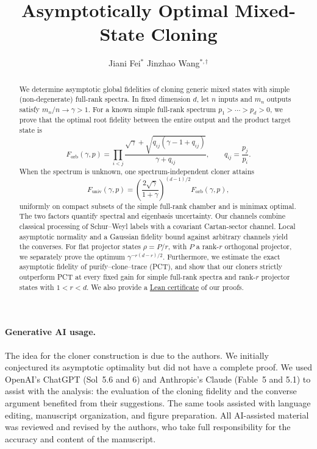 \documentclass[11pt]{article}
\title{Asymptotically Optimal Mixed-State Cloning}
\author{Jiani Fei\(^{*}\)\qquad
  Jinzhao Wang\(^{*,\dagger}\)}
\date{}
\theoremstyle{remark}
\theoremstyle{plain}
\newcommand{\Forb}{F_{\mathrm{orb}}}
\newcommand{\Funiv}{F_{\mathrm{univ}}}
\begin{document}
\maketitle
\begingroup
\renewcommand{\thefootnote}{\fnsymbol{footnote}}
\endgroup

\begin{abstract}
We determine asymptotic global fidelities of cloning generic
mixed states with simple (non-degenerate) full-rank spectra. In fixed dimension $d$, let $n$ inputs and
$m_n$ outputs satisfy $m_n/n\to\gamma>1$.  For a known simple
full-rank spectrum $p_1>\cdots>p_d>0$, we prove that the optimal root
fidelity between the entire output and the product target state is
$$
  \Forb(\gamma,p)
  =\prod_{i<j}
  \frac{\sqrt{\gamma}+\sqrt{q_{ij}(\gamma-1+q_{ij})}}
       {\gamma+q_{ij}},
  \qquad q_{ij}=\frac{p_j}{p_i}.
$$
When the spectrum is unknown, one spectrum-independent cloner attains
$$
  \Funiv(\gamma,p)
  =\left(\frac{2\sqrt\gamma}{1+\gamma}\right)^{(d-1)/2}
   \Forb(\gamma,p),
$$
uniformly on compact subsets of the simple full-rank chamber and is minimax optimal.  The two factors quantify
spectral and eigenbasis uncertainty.  Our channels combine classical
processing of Schur--Weyl labels with a covariant Cartan-sector channel.
Local asymptotic normality and a Gaussian fidelity bound against arbitrary
channels yield the converses.  For flat projector states $\rho=P/r$,
with $P$ a rank-$r$ orthogonal projector, we separately prove the
optimum $\gamma^{-r(d-r)/2}$.  Furthermore, we estimate the exact asymptotic fidelity
of purify--clone--trace (PCT), and show that our cloners strictly
outperform PCT at every fixed gain for simple full-rank spectra and
rank-$r$ projector states with $1<r<d$. We also provide a \href{https://github.com/JWang226/Cloning}{Lean certificate} of our proofs.
\end{abstract}

\vspace{3em}
\begin{samepage}
\paragraph{Generative AI usage.}
The idea for the cloner construction is due to the authors. We
initially conjectured its asymptotic optimality but did not have a complete
proof.  We used OpenAI's ChatGPT (Sol~5.6 and 6) and Anthropic's Claude
(Fable~5 and 5.1) to assist with the analysis: the evaluation of the
cloning fidelity and the converse argument benefited from their
suggestions.  The same tools assisted with language editing, manuscript
organization, and figure preparation.  All AI-assisted material was
reviewed and revised by the authors, who take full responsibility for the
accuracy and content of the manuscript.
\end{samepage}
\end{document}
